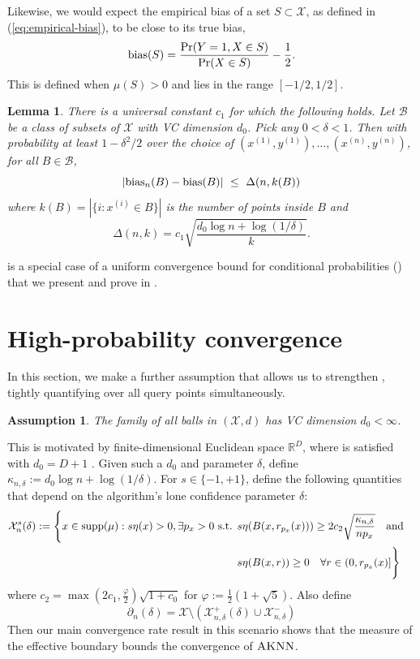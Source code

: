 \documentclass{article}
\def\pr{{\rm Pr}}
\def\X{{\mathcal X}}
\def\B{{\mathcal B}}
\def\bias{{\rm bias}}
\def\supp{{\rm supp}}
\newcommand{\algname}{\textsc{AKNN}}
\newtheorem{lemma}[theorem]{Lemma}
\newtheorem{assump}{Assumption}
\begin{document}
Likewise, we would expect the empirical bias of a set $S \subset \X$, as defined in (\ref{eq:empirical-bias}), to be close to its true bias,
$$ \bias(S) = \frac{\pr(Y = 1, X \in S)}{\pr(X \in S)} - \frac{1}{2} .$$
This is defined when $\mu(S) > 0$ and lies in the range $[-1/2,1/2]$.

\begin{lemma}
There is a universal constant $c_1$ for which the following holds. Let $\B$ be a class of subsets of $\X$ with VC dimension $d_0$. Pick any $0 < \delta < 1$. Then with probability at least $1-\delta^2/2$ over the choice of $(x^{(1)}, y^{(1)}), \ldots, (x^{(n)}, y^{(n)})$, for all $B \in \B$,
  $$ \left| \bias_n(B) - \bias(B) \right| \ \leq \ \Delta(n, k(B)) $$
where $k(B) = |\{i: x^{(i)} \in B\}|$ is the number of points inside $B$ and 
\begin{equation}
\Delta(n,k) = c_1 \sqrt{\frac{d_0 \log n + \log (1/\delta)}{k}} .
\label{eq:delta-defn}
\end{equation}
\label{lemma:bias}
\end{lemma}

 is a special case of a uniform convergence bound for conditional probabilities () 
that we present and prove in .

\section{High-probability convergence}

In this section, we make a further assumption that allows us to strengthen , tightly quantifying over all query points simultaneously. 
\begin{assump}
\label{assump:VCallballs}
The family of all balls in $(\X, d)$ has VC dimension $d_0 < \infty$.
\end{assump}
This is motivated by finite-dimensional Euclidean space $\mathbb{R}^{D}$, where  is satisfied with $d_0 = D+1$ \citep{dudley79}. Given such a $d_0$ and parameter $\delta$, define $\kappa_{n, \delta} := d_0 \log n + \log (1/\delta)$. 
For $s \in \{ -1, +1 \}$, define the following quantities that depend on the algorithm's lone confidence parameter $\delta$:
\begin{align*}
\X^{s}_n (\delta)
:= \Bigg\{
x \in \supp(\mu) : s \eta(x) > 0 , \exists p_x > 0 \text{ s.t. } 
&s \eta(B(x,r_{p_x}(x))) \geq 2 c_2 \sqrt{\frac{ \kappa_{n, \delta} }{n p_x}}
\quad\text{and}\quad \\
&s \eta(B(x,r)) \geq 0 \quad\forall r \in (0, r_{p_x}(x)]
\Bigg\}
\end{align*}
where $c_2 = \max(2c_1, \frac{\varphi}{2} ) \sqrt{1 + c_0}$ for $\varphi := \frac{1}{2} (1 + \sqrt{5})$.
Also define 
$$ \partial_n (\delta) = \X \setminus (\X^+_{n,\delta} (\delta) \cup \X^-_{n,\delta}) $$
Then our main convergence rate result in this scenario shows that the measure of the effective boundary bounds the convergence of $\algname$.
\end{document}
